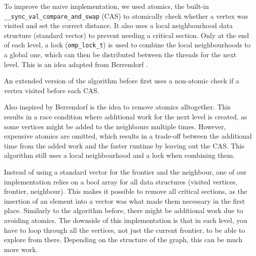 \documentclass[letterpaper]{article}
\begin{document}
	To improve the naive implementation, we used atomics, the built-in \verb+__sync_val_compare_and_swap+ (CAS) to atomically check whether a vertex was visited and set the correct distance. It also uses a local neighbourhood data structure (standard vector) to prevent needing a critical section. Only at the end of each level, a lock (\verb+omp_lock_t+) is used to combine the local neighbourhoods to a global one, which can then be distributed between the threads for the next level. This is an idea adapted from Berrendorf \cite{Berrendorf:14}.
	
	An extended version of the algorithm before first uses a non-atomic check if a vertex visited before each CAS.
	
	Also inspired by Berrendorf \cite{Berrendorf:14} is the idea to remove atomics alltogether. This results in a race condition where additional work for the next level is created, as some vertices might be added to the neighbours multiple times. However, expensive atomics are omitted, which results in a trade-off between the additional time from the added work and the faster runtime by leaving out the CAS. This algorithm still uses a local neighbourhood and a lock when combining them.
	
	Instead of using a standard vector for the frontier and the neighbour, one of our implementation relies on a bool array for all data structures (visited vertices, frontier, neighbour). This makes it possible to remove all critical sections, as the insertion of an element into a vector was what made them necessary in the first place. Similarly to the algorithm before, there might be additional work due to avoiding atomics. The downside of this implementation is that in each level, you have to loop through all the vertices, not just the current frontier, to be able to explore from there. Depending on the structure of the graph, this can be much more work.
	
\end{document}
